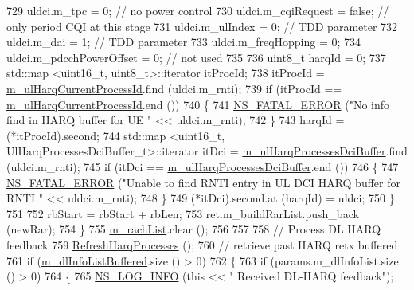 \begin{DoxyCode}
729           uldci.m\_tpc = 0; \textcolor{comment}{// no power control}
730           uldci.m\_cqiRequest = \textcolor{keyword}{false}; \textcolor{comment}{// only period CQI at this stage}
731           uldci.m\_ulIndex = 0; \textcolor{comment}{// TDD parameter}
732           uldci.m\_dai = 1; \textcolor{comment}{// TDD parameter}
733           uldci.m\_freqHopping = 0;
734           uldci.m\_pdcchPowerOffset = 0; \textcolor{comment}{// not used}
735 
736           uint8\_t harqId = 0;
737           std::map <uint16\_t, uint8\_t>::iterator itProcId;
738           itProcId = \hyperlink{classns3_1_1FdBetFfMacScheduler_a12a5dedfa74cd590624828dcffafa855}{m\_ulHarqCurrentProcessId}.find (uldci.m\_rnti);
739           \textcolor{keywordflow}{if} (itProcId == \hyperlink{classns3_1_1FdBetFfMacScheduler_a12a5dedfa74cd590624828dcffafa855}{m\_ulHarqCurrentProcessId}.end ())
740             \{
741               \hyperlink{group__fatal_ga5131d5e3f75d7d4cbfd706ac456fdc85}{NS\_FATAL\_ERROR} (\textcolor{stringliteral}{"No info find in HARQ buffer for UE "} << uldci.m\_rnti);
742             \}
743           harqId = (*itProcId).second;
744           std::map <uint16\_t, UlHarqProcessesDciBuffer\_t>::iterator itDci = 
      \hyperlink{classns3_1_1FdBetFfMacScheduler_a9b0359136a7f50a8baf80b3b17367869}{m\_ulHarqProcessesDciBuffer}.find (uldci.m\_rnti);
745           \textcolor{keywordflow}{if} (itDci == \hyperlink{classns3_1_1FdBetFfMacScheduler_a9b0359136a7f50a8baf80b3b17367869}{m\_ulHarqProcessesDciBuffer}.end ())
746             \{
747               \hyperlink{group__fatal_ga5131d5e3f75d7d4cbfd706ac456fdc85}{NS\_FATAL\_ERROR} (\textcolor{stringliteral}{"Unable to find RNTI entry in UL DCI HARQ buffer for RNTI "} << 
      uldci.m\_rnti);
748             \}
749           (*itDci).second.at (harqId) = uldci;
750         \}
751 
752       rbStart = rbStart + rbLen;
753       ret.m\_buildRarList.push\_back (newRar);
754     \}
755   \hyperlink{classns3_1_1FdBetFfMacScheduler_a561288dcd0f30666e1ea6fe6166f30b4}{m\_rachList}.clear ();
756 
757 
758   \textcolor{comment}{// Process DL HARQ feedback}
759   \hyperlink{classns3_1_1FdBetFfMacScheduler_ac1dabffc12ddc6e292287e1656e79898}{RefreshHarqProcesses} ();
760   \textcolor{comment}{// retrieve past HARQ retx buffered}
761   \textcolor{keywordflow}{if} (\hyperlink{classns3_1_1FdBetFfMacScheduler_ae987d949dcc264154314730346f4a7a8}{m\_dlInfoListBuffered}.size () > 0)
762     \{
763       \textcolor{keywordflow}{if} (params.m\_dlInfoList.size () > 0)
764         \{
765           \hyperlink{group__logging_gafbd73ee2cf9f26b319f49086d8e860fb}{NS\_LOG\_INFO} (\textcolor{keyword}{this} << \textcolor{stringliteral}{" Received DL-HARQ feedback"});

\end{DoxyCode}
